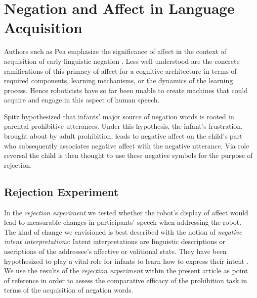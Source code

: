 \section{Negation and Affect in Language Acquisition}
\label{sec:negation_affect}
Authors such as Pea emphasize the significance of affect in the context of acquisition of early linguistic negation \cite{Pea1980}.
Less well understood are the concrete ramifications of this primacy of affect for a cognitive architecture in terms of required
components, learning mechanisms, or the dynamics of the learning process. Hence roboticists have so far been unable to create machines
that could acquire and engage in this aspect of human speech.

Spitz \cite{Spitz1957} hypothesized that infants' major source of negation words is rooted in parental prohibitive utterances. Under this hypothesis, the 
infant's frustration, brought about by adult prohibition, leads to negative affect on the child's part who subsequently associates negative affect 
with the negative utterance. Via role reversal the child is then thought to use these negative symbols for the purpose of rejection. 

\subsection{Rejection Experiment}
In the \emph{rejection experiment} \cite{Foerster2017} we tested whether the robot's display of affect would lead to measurable changes in participants' speech
when addressing the robot. The kind of change we envisioned is best described with the notion of \emph{negative intent interpretations}: Intent interpretations
are linguistic descriptions or ascriptions of the addressee's affective or volitional state. They have been hypothesized to play a vital role for infants
to learn how to express their intent \cite{Ryan1974,Pea1980}. We use the results of the \emph{rejection experiment} within the present article as point of
reference in order to assess the comparative efficacy of the prohibition task in terms of the acquisition of negation words.\\[0.5ex]

